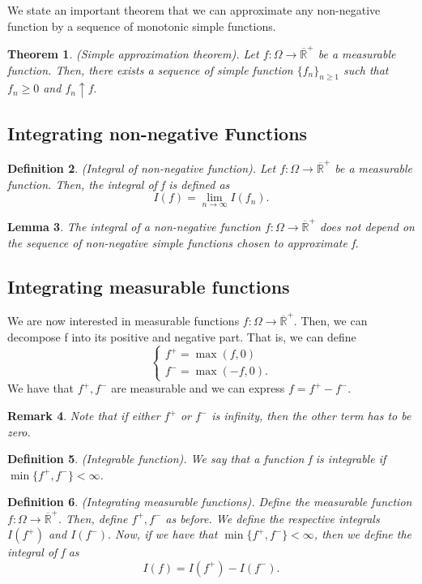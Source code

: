 \documentclass[twoside]{article}
\newcounter{lecnum}
\newtheorem{theorem}{Theorem}[lecnum]
\newtheorem{lemma}[theorem]{Lemma}
\newtheorem{definition}[theorem]{Definition}
\newtheorem{remark}[theorem]{Remark}
\newcommand{\positiveextendedreal}{\overline{\mathbb{R}}^+}
\begin{document}
We state an important theorem that we can approximate any non-negative function by a sequence of monotonic simple functions.
\begin{theorem}(Simple approximation theorem). Let $f: \Omega \rightarrow \positiveextendedreal$ be a measurable function. Then, there exists a sequence of simple function $\{f_n\}_{n \geq 1}$ such that $f_n \geq 0$ and $f_n \uparrow f.$
\end{theorem}


\subsection{Integrating non-negative Functions}
\begin{definition}(Integral of non-negative function). Let $f: \Omega \rightarrow \positiveextendedreal$ be a measurable function. Then, the integral of f is defined as 
$$
I(f) = \lim_{n \rightarrow \infty}I(f_n).
$$
\end{definition}

\begin{lemma}The integral of a non-negative function $f: \Omega \rightarrow \positiveextendedreal$ does not depend on the sequence of non-negative simple functions chosen to approximate f.
\end{lemma}
\subsection{Integrating measurable functions}

We are now interested in measurable functions $f: \Omega \rightarrow \positiveextendedreal.$ Then, we can decompose f into its positive and negative part. That is, we can define 
$$
\begin{cases}
f^+ = \max(f, 0)\\
f^- = \max(-f, 0).
\end{cases}
$$
We have that $f^+, f^-$ are measurable and we can express $f = f^+ - f^-.$

\begin{remark}Note that if either $f^+$ or $f^-$ is infinity, then the other term has to be zero.
\end{remark}

\begin{definition}(Integrable function). We say that a function f is integrable if  $\min\{f^+, f^-\} < \infty$.
\end{definition}

\begin{definition}(Integrating measurable functions). Define the measurable function  $f: \Omega \rightarrow \positiveextendedreal.$ Then, define $f^+,f^-$ as before. We define the respective integrals $I(f^+)$ and $I(f^-).$ Now, if we have that $\min\{f^+, f^-\} < \infty$, then we define the integral of f as 
$$
I(f) = I(f^+) - I(f^-).
$$
\end{definition}
\end{document}
